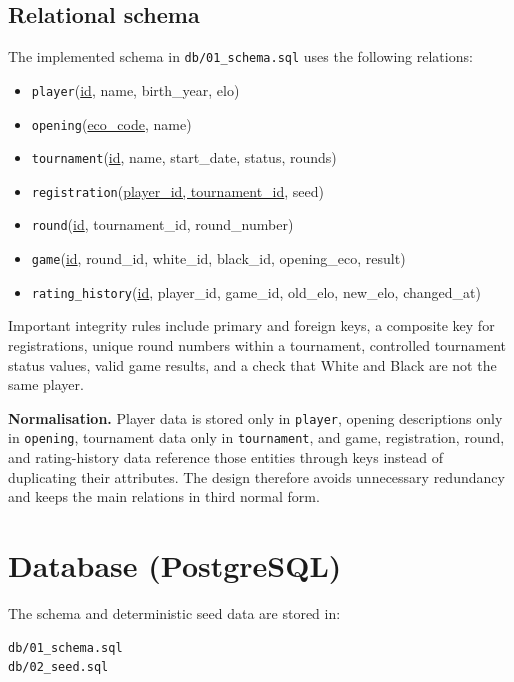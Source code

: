 \documentclass[11pt,a4paper]{article}
\begin{document}
\subsection{Relational schema}

The implemented schema in \texttt{db/01\_schema.sql} uses the following
relations:

\begin{itemize}[leftmargin=1.4em]
  \item \texttt{player}(\underline{id}, name, birth\_year, elo)
  \item \texttt{opening}(\underline{eco\_code}, name)
  \item \texttt{tournament}(\underline{id}, name, start\_date, status, rounds)
  \item \texttt{registration}(\underline{player\_id, tournament\_id}, seed)
  \item \texttt{round}(\underline{id}, tournament\_id, round\_number)
  \item \texttt{game}(\underline{id}, round\_id, white\_id, black\_id,
        opening\_eco, result)
  \item \texttt{rating\_history}(\underline{id}, player\_id, game\_id,
        old\_elo, new\_elo, changed\_at)
\end{itemize}

Important integrity rules include primary and foreign keys, a composite key for
registrations, unique round numbers within a tournament, controlled tournament
status values, valid game results, and a check that White and Black are not the
same player.

\textbf{Normalisation.}
Player data is stored only in \texttt{player}, opening descriptions only in
\texttt{opening}, tournament data only in \texttt{tournament}, and game,
registration, round, and rating-history data reference those entities through
keys instead of duplicating their attributes. The design therefore avoids
unnecessary redundancy and keeps the main relations in third normal form.

\section{Database (PostgreSQL)}

The schema and deterministic seed data are stored in:

\begin{verbatim}
db/01_schema.sql
db/02_seed.sql
\end{verbatim}
\end{document}
